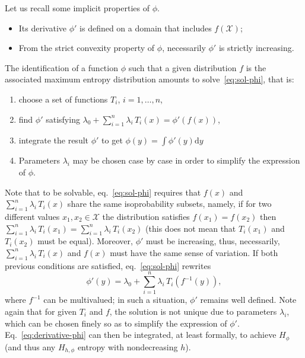 \documentclass[english,sort&compress]{elsarticle}
\theoremstyle{definition}
\theoremstyle{plain}
\theoremstyle{plain}
\def\d{\mathrm{d}}
\def\X{\mathcal{X}}
\begin{document}
Let us recall some implicit properties of $\phi$. 
%
\begin{itemize}
\item Its derivative $\phi'$ is defined on a domain that includes $f(\X)$;
\item  From the  strict convexity  property  of $\phi$,  necessarily $\phi'$  is
  strictly increasing.
\end{itemize}
%
The identification  of a function $\phi$  such that a given  distribution $f$ is
the associated maximum entropy distribution amounts to solve~\eqref{eq:sol-phi},
that is:
%
\begin{enumerate}
\item choose a set of functions $T_i$, $i = 1 , \ldots , n$,
\item find $\phi'$ satisfying ${\displaystyle \lambda_0 + \sum_{i=1}^n \lambda_i
    \, T_i(x) = \phi'(f(x))}$,
\item  integrate  the result  $\phi'$  to  get  ${\displaystyle \phi(y)  =  \int
    \phi'(y) \d y}$
\item Parameters $\lambda_i$ may be chosen case by case in order to simplify the
  expression of $\phi$.
\end{enumerate}
%
Note  that  to be  solvable,  eq.~\eqref{eq:sol-phi}  requires  that $f(x)$  and
$\displaystyle \sum_{i=1}^n  \lambda_i \, T_i(x)$ share  the same isoprobability
subsets, namely, if for two different values $x_1 , x_2 \in \X$ the distribution
satisfies  $f(x_1)  =  f(x_2)$  then $\displaystyle  \sum_{i=1}^n  \lambda_i  \,
T_i(x_1)  =  \sum_{i=1}^n  \lambda_i  \,  T_i(x_2)$ (this  does  not  mean  that
$T_i(x_1)$ and $T_i(x_2)$ must be equal).  Moreover, $\phi'$ must be increasing,
thus, necessarily, ${\displaystyle \sum_{i=1}^n \lambda_i \, T_i(x)}$ and $f(x)$
must have the same sense of variation.
If both previous conditions are satisfied, eq.~\eqref{eq:sol-phi} rewrites
%
\begin{equation}\label{eq:derivative-phi}
\phi'(y) = \lambda_0 + \sum_{i=1}^n \lambda_i \, T_i\!\left(f^{-1}(y)\right),
\end{equation}
%
where $f^{-1}$  can be  multivalued; in such  a situation, $\phi'$  remains well
defined. Note again that for given $T_i$ and $f$, the solution is not unique due
to parameters  $\lambda_i$, which  can be  chosen finely so  as to  simplify the
expression of $\phi'$.  Eq.~\eqref{eq:derivative-phi} can then be integrated, at
least  formally, to  achieve $H_\phi$  (and thus  any $H_{h,\phi}$  entropy with
nondecreasing $h$).
\end{document}
